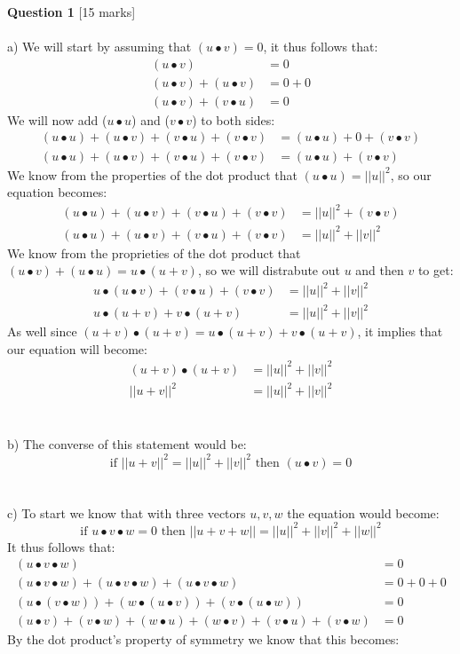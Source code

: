 \documentclass[11pt]{article}
\begin{document}
\textbf{Question 1} [15 marks] \\\\
a) We will start by assuming that $(u \bullet v) = 0$, it thus follows that:
\begin{align*}
(u \bullet v)  &= 0 \\
(u \bullet v)  + (u \bullet v) &= 0 + 0\\
(u \bullet v) + (v \bullet u) &= 0
\end{align*}
We will now add ($u \bullet u$) and ($v \bullet v$) to both sides:
\begin{align*}
(u \bullet u) + (u \bullet v)  + (v \bullet u) + (v \bullet v)  &=(u \bullet u) + 0 + (v \bullet v)\\
(u \bullet u) + (u \bullet v)  + (v \bullet u) + (v \bullet v)  &=(u \bullet u) + (v \bullet v)
\end{align*}
We know from the properties of the dot product that $(u\bullet u) = ||u||^2$, so our equation becomes:
\begin{align*}
(u \bullet u) + (u \bullet v)  + (v \bullet u) + (v \bullet v)  &=||u||^2 + (v \bullet v)\\
(u \bullet u) + (u \bullet v)  + (v \bullet u) + (v \bullet v)  &=||u||^2 + ||v||^2
\end{align*}
We know from the proprieties of the dot product that $(u \bullet v) + (u \bullet u) = u \bullet (u+ v)$, so we will distrabute out $u$ and then $v$ to get:
\begin{align*}
u \bullet (u \bullet v)  + (v \bullet u) + (v \bullet v)  &=||u||^2 + ||v||^2\\
u \bullet (u + v) +  v \bullet (u + v) &=||u||^2 + ||v||^2
\end{align*}
As well since $(u + v) \bullet (u + v)  = u \bullet (u + v) +  v \bullet (u + v)$, it implies that our equation will become:
\begin{align*}
(u + v) \bullet (u + v) &=||u||^2 + ||v||^2 \\
||u + v||^2 &=||u||^2 + ||v||^2
\end{align*}\\\\
b) The converse of this statement would be:
\[ \text{if } ||u + v||^2 = ||u||^2 + ||v||^2 \text{ then } (u \bullet v) = 0 \]\\\\
c) To start we know that with three vectors $u, v, w$ the equation would become:
\[ \text{if } u \bullet v \bullet w = 0 \text{ then } ||u + v + w|| = ||u||^2 + ||v||^2 + ||w||^2 \]
It thus follows that:
\begin{align*}
(u \bullet v \bullet w)  &= 0 \\
(u \bullet v \bullet w) + (u \bullet v \bullet w) +(u \bullet v \bullet w)  &= 0 + 0 + 0 \\
(u \bullet (v \bullet w)) + (w \bullet (u \bullet v)) +(v \bullet (u \bullet w))  &= 0 \\
(u \bullet v) + (v \bullet w)+ (w \bullet u) + (w \bullet v) + (v \bullet u) + (v \bullet w)  &= 0 
\end{align*}
By the dot product's property of symmetry we know that this becomes:
\end{document}
